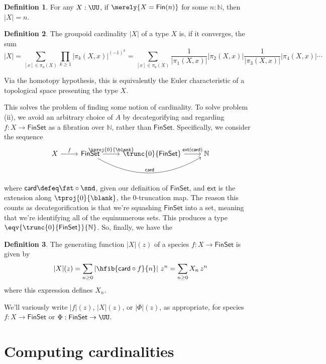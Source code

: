 \documentclass[fleqn]{article}
\newcommand{\card}{\mathsf{card}}
\newcommand{\gf}[1]{\abs{#1}\!(z)}
\newcommand{\fin}{\mathsf{Fin}}
\newcommand{\finset}{\mathsf{FinSet}}
\newcommand{\abs}[1]{\left\lvert #1 \right\rvert}
\theoremstyle{theorem}
\theoremstyle{definition}
\newtheorem{defn}{Definition}[section]
\begin{document}
\begin{defn}
  For any $X : \UU$, if $\merely{X = \fin(n)}$ for some $n : \mathbb{N}$, then
  $\abs{X} = n$.
\end{defn}

\begin{defn}
  The groupoid cardinality $\abs{X}$ of a type $X$ is, if it converges, the sum
  \[
    \abs{X} 
    = \sum_{[x] \in \pi_{0}(X)}\prod_{k\geq1} 
        \abs{\pi_{k}(X, x)}^{(-1)^{k}}
    = \sum_{[x] \in \pi_{0}(X)}
        \frac{1}{\abs{\pi_{1}(X, x)}}\abs{\pi_{2}(X, x)}
        \frac{1}{\abs{\pi_{3}(X, x)}}\abs{\pi_{4}(X, x)}
        \dotsm
  \]
\end{defn}

\noindent
Via the homotopy hypothesis, this is equivalently the Euler characteristic of
a topological space presenting the type $X$.

This solves the problem of finding some notion of cardinality.  To solve
problem (ii), we avoid an arbitrary choice of $A$ by decategorifying and
regarding $f : X \to \finset$ as a fibration over $\mathbb{N}$, rather than
$\finset$.  Specifically, we consider the sequence
\[ \begin{tikzcd}
    X \ar[r, "f"] & 
    \finset \ar[r, "\tproj{0}{\blank}"] \ar[rr, bend right, "\card"] &
    \trunc{0}{\finset} \ar[r, "\mathsf{ext}(\card)"] &
    \mathbb{N}
\end{tikzcd}  \]
where $\card \defeq \fst \circ \snd$, given our definition of $\finset$, and
$\mathsf{ext}$ is the extension along $\tproj{0}{\blank}$, the $0$-truncation
map.  The reason this counts as decategorification is that we're squashing
$\finset$ into a set, meaning that we're identifying all of the equinumerous
sets.  This produces a type $\eqv{\trunc{0}{\finset}}{\mathbb{N}}$.  So,
finally, we have the
\begin{defn}
  The generating function $\gf{X}$ of a species $f : X \to \finset$ is given by
  \[
    \gf{X}
    =
    \sum_{n\geq0}
    \abs{\hfib{\card \circ f}{n}}\,
    z^{n}
    =
    \sum_{n\geq0}
    X_{n}\, z^{n}
  \]
  where this expression defines $X_{n}$.
\end{defn}
\noindent
We'll variously write $\gf{f}$, $\gf{X}$, or $\gf{\Phi}$, as appropriate, for
species $f : X \to \finset$ or $\Phi : \finset \to \UU$.


\section{Computing cardinalities}
\end{document}
